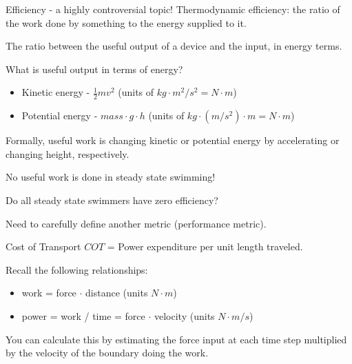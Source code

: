 \documentclass{beamer}
\begin{document}
\begin{frame}{Efficiency - a highly controversial topic!}
Thermodynamic efficiency: the ratio of the work done by something to the energy supplied to it.

The ratio between the useful output of a device and the input, in energy terms.

What is useful output in terms of energy?
\begin{itemize}
    \item Kinetic energy - \( \frac{1}{2} mv^2 \) (units of \( kg \cdot m^2/s^2 = N \cdot m \))
    \item Potential energy - \( mass \cdot g \cdot h \) (units of \( kg \cdot (m/s^2) \cdot m = N \cdot m \))
\end{itemize}
Formally, useful work is changing kinetic or potential energy by accelerating or changing height, respectively.

No useful work is done in steady state swimming!

Do all steady state swimmers have zero efficiency?

Need to carefully define another metric (performance metric).
\end{frame}


\begin{frame}{Cost of Transport}
\( COT \) = Power expenditure per unit length traveled.

Recall the following relationships:
\begin{itemize}
    \item work = force \( \cdot \) distance (units \( N \cdot m \))
    \item power = work / time = force \( \cdot \) velocity (units \( N \cdot m/s \))
\end{itemize}
You can calculate this by estimating the force input at each time step multiplied by the velocity of the boundary doing the work.
\end{frame}
\end{document}
